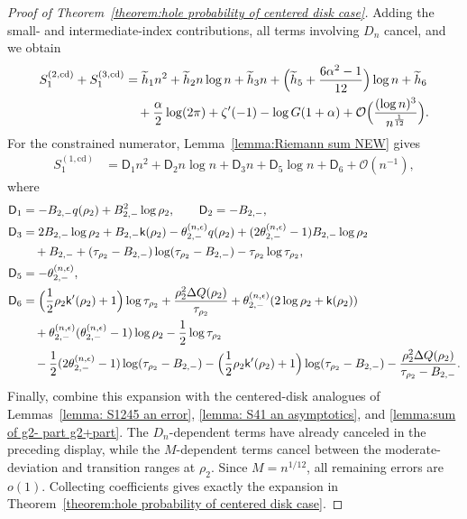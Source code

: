 \documentclass[a4paper]{article}
\numberwithin{equation}{section}
\begin{document}
\begin{proof}[Proof of Theorem~\ref{theorem:hole probability of centered disk case}]
Adding the small- and intermediate-index contributions, all terms involving $D_n$ cancel, and we obtain
\begin{align*}
S_1^{(2,\mathrm{cd})}+S_1^{(3,\mathrm{cd})}
&=
\widetilde{h}_{1}n^2+\widetilde{h}_2n\log n+\widetilde{h}_3n
+\Bigl(\widetilde{h}_5+\frac{6\alpha^2-1}{12}\Bigr)\log n
+\widetilde{h}_6
\\
&\quad 
+\frac{\alpha}{2}\log (2\pi)+\zeta'(-1)
-\log G(1+\alpha)+\mathcal{O}\Bigl(\frac{(\log n)^3}{n^{\frac{1}{12}}}\Bigr).    
\end{align*}
For the constrained numerator, Lemma~\ref{lemma:Riemann sum NEW} gives
\begin{align*}
S_1^{(1,\mathrm{cd})}
&=
\mathsf{D}_1n^2+\mathsf{D}_2n\log n+\mathsf{D}_3n+\mathsf{D}_5\log n+\mathsf{D}_6+\mathcal{O}(n^{-1}),
\end{align*}
where 
\begin{align*}
\mathsf{D}_1&=-B_{2,-}q(\rho_2)+B_{2,-}^2\log\rho_2, 
\qquad
\mathsf{D}_2=-B_{2,-},
\\
\mathsf{D}_3&=2B_{2,-}\log\rho_2
+B_{2,-}\mathsf{k}(\rho_2)
-\theta_{2,-}^{(n,\epsilon)}q(\rho_2)
+(2\theta_{2,-}^{(n,\epsilon)}-1)B_{2,-}\log\rho_2
\\
&\quad
+B_{2,-}+(\tau_{\rho_2}-B_{2,-})\log(\tau_{\rho_2}-B_{2,-})-\tau_{\rho_2}\log\tau_{\rho_2},
\\
\mathsf{D}_5&=-\theta_{2,-}^{(n,\epsilon)}, 
\\
\mathsf{D}_6&=
\Bigl(\frac{1}{2}\rho_2\mathsf{k}'(\rho_2)+1\Bigr)\log\tau_{\rho_2}
+\frac{\rho_2^2\Delta Q(\rho_2)}{\tau_{\rho_2}}
+\theta_{2,-}^{(n,\epsilon)}(2\log\rho_2+\mathsf{k}(\rho_2))
\\
&\quad+\theta_{2,-}^{(n,\epsilon)}(\theta_{2,-}^{(n,\epsilon)}-1)\log\rho_2
-\frac{1}{2}\log\tau_{\rho_2}
\\
&\quad
-\frac{1}{2}(2\theta_{2,-}^{(n,\epsilon)}-1)\log(\tau_{\rho_2}-B_{2,-})
-\Bigl(\frac{1}{2}\rho_2\mathsf{k}'(\rho_2)+1\Bigr)\log(\tau_{\rho_2}-B_{2,-})
-\frac{\rho_2^2\Delta Q(\rho_2)}{\tau_{\rho_2}-B_{2,-}}. 
\end{align*}
Finally, combine this expansion with the centered-disk analogues of Lemmas~\ref{lemma: S1245 an error}, \ref{lemma: S41 an asymptotics}, and \ref{lemma:sum of g2- part g2+part}. The $D_n$-dependent terms have already canceled in the preceding display, while the $M$-dependent terms cancel between the moderate-deviation and transition ranges at $\rho_2$. Since $M=n^{1/12}$, all remaining errors are $o(1)$. Collecting coefficients gives exactly the expansion in Theorem~\ref{theorem:hole probability of centered disk case}.

\end{proof}
\end{document}
